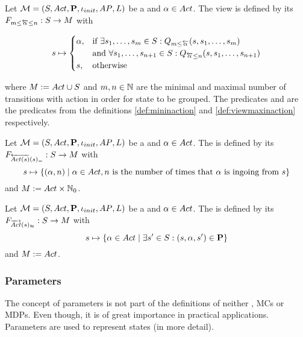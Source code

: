\documentclass[preview]{standalone}
\begin{document}
\begin{definition}
	Let $\chgph = \chgphtuple$ be a \chosengraphtypeN and $\action \in \actions$. The view 
	\viewspaninaction is defined by its \grpfctN $\gfctspaninaction : \states \to \arbset$ with
	
	\[
	\state \mapsto
	\begin{cases}
		\action,				& \text{if } \exists \state_1, \dots, \state_\numinactb \in \states: \predmininact[\numinactb] \\ &\text{and } \forall \state_1, \dots, \state_{\numinact+1} \in \states: \predmaxinact \\
		\state,          	& \text{otherwise}
	\end{cases}
	\]
	
	where $\imggrp := \actions \cup \states$ and $\numinactb, \numinact \in \natnums$ are the minimal and maximal number of transitions with action \action in order for state to be grouped. The predicates \predmininact and \predmaxinact are the predicates from the definitions \ref{def:mininaction} and \ref{def:viewmaxinaction} respectively.
\end{definition}

\begin{definition}
	Let $\chgph = \chgphtuple$ be a \chosengraphtypeN and $\action \in \actions$. The \viewN \viewstronginactident is defined by its \grpfctN $\gfctstronginactident : \states \to \imggrp$ with
	\[
	\state \mapsto	
	\{(\action, \numinact) \mid \action \in \actions, \numinact \text{ is the number of times that \action is ingoing from } \state\}
	\]
	and $\imggrp := \actions \times \natnums_0$.
\end{definition}

\begin{definition}
	Let $\chgph = \chgphtuple$ be a \chosengraphtypeN and $\action \in \actions$. The \viewN \viewweakoutactident is defined by its \grpfctN $\gfctweakoutactident : \states \to \imggrp$ with
	\[
	\state \mapsto \{\action \in \actions \mid \exists \state' \in \states : (\state, \action, \state') \in \trans\} 	
	\]
	and $\imggrp := \actions$.
\end{definition}

\subsubsection{Parameters}
The concept of parameters is not part of the definitions of neither \chosengraphtypesN, MCs or MDPs. Even though, it is of great importance in practical applications. Parameters are used to represent states (in more detail). 
\end{document}
